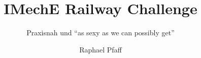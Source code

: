 \documentclass[slidestop,compress,mathserif, aspectratio = 169]{beamer}
\begin{document}
\newcommand{\source}[1]{\rotatebox{90}{\tiny \color{gray} #1}}

\newcommand{\done}{${\color{teal}\checkmark}$}

\title{IMechE Railway Challenge}
\subtitle{Praxisnah und ``as sexy as we can possibly get''}
\author{Raphael Pfaff}





\frame{\titlepage}


\usebackgroundtemplate{}
\end{document}
